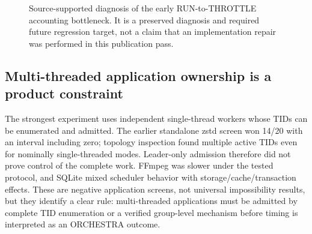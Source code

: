 \documentclass[10pt,letterpaper,twocolumn]{article}
\begin{document}
\begin{figure}[t]
\centering
{}
\caption{Source-supported diagnosis of the early RUN-to-THROTTLE accounting bottleneck. It is a preserved diagnosis and required future regression target, not a claim that an implementation repair was performed in this publication pass.}
\label{fig:throttle-bottleneck}
\end{figure}

\subsection{Multi-threaded application ownership is a product constraint}

The strongest experiment uses independent single-thread workers whose TIDs can be enumerated and admitted. The earlier standalone zstd screen won 14/20 with an interval including zero; topology inspection found multiple active TIDs even for nominally single-threaded modes. Leader-only admission therefore did not prove control of the complete work. FFmpeg was slower under the tested protocol, and SQLite mixed scheduler behavior with storage/cache/transaction effects. These are negative application screens, not universal impossibility results, but they identify a clear rule: multi-threaded applications must be admitted by complete TID enumeration or a verified group-level mechanism before timing is interpreted as an ORCHESTRA outcome.
\end{document}
